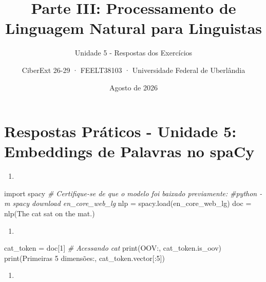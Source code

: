 \documentclass[
  brazilian,
]{article}
\title{Parte III: Processamento de Linguagem Natural para Linguistas}
\subtitle{Unidade 5 - Respostas dos Exercícios}
\author{CiberExt 26-29 · FEELT38103 · Universidade Federal de
Uberlândia}
\date{Agosto de 2026}
\newenvironment{Shaded}{}{}
\newcommand{\BuiltInTok}[1]{#1}
\newcommand{\CommentTok}[1]{\textcolor[rgb]{0.38,0.63,0.69}{\textit{#1}}}
\newcommand{\DecValTok}[1]{\textcolor[rgb]{0.25,0.63,0.44}{#1}}
\newcommand{\ImportTok}[1]{#1}
\newcommand{\NormalTok}[1]{#1}
\newcommand{\OperatorTok}[1]{\textcolor[rgb]{0.40,0.40,0.40}{#1}}
\newcommand{\StringTok}[1]{\textcolor[rgb]{0.25,0.44,0.63}{#1}}
\providecommand{\tightlist}{%
  \setlength{\itemsep}{0pt}\setlength{\parskip}{0pt}}
\begin{document}
\maketitle

\hypertarget{respostas-pruxe1ticos---unidade-5-embeddings-de-palavras-no-spacy}{%
\section{Respostas Práticos - Unidade 5: Embeddings de Palavras no
spaCy}\label{respostas-pruxe1ticos---unidade-5-embeddings-de-palavras-no-spacy}}

\begin{enumerate}
\def\labelenumi{\arabic{enumi}.}
\tightlist
\item
\end{enumerate}

\begin{Shaded}
\begin{Highlighting}[]
\ImportTok{import}\NormalTok{ spacy}
\CommentTok{\# Certifique{-}se de que o modelo foi baixado previamente: }
\CommentTok{\#python {-}m spacy download en\_core\_web\_lg}
\NormalTok{nlp }\OperatorTok{=}\NormalTok{ spacy.load(}\StringTok{\textquotesingle{}en\_core\_web\_lg\textquotesingle{}}\NormalTok{)}
\NormalTok{doc }\OperatorTok{=}\NormalTok{ nlp(}\StringTok{\textquotesingle{}The cat sat on the mat.\textquotesingle{}}\NormalTok{)}
\end{Highlighting}
\end{Shaded}

\begin{enumerate}
\def\labelenumi{\arabic{enumi}.}
\setcounter{enumi}{1}
\tightlist
\item
\end{enumerate}

\begin{Shaded}
\begin{Highlighting}[]
\NormalTok{cat\_token }\OperatorTok{=}\NormalTok{ doc[}\DecValTok{1}\NormalTok{] }\CommentTok{\# Acessando \textquotesingle{}cat\textquotesingle{}}
\BuiltInTok{print}\NormalTok{(}\StringTok{\textquotesingle{}OOV:\textquotesingle{}}\NormalTok{, cat\_token.is\_oov)}
\BuiltInTok{print}\NormalTok{(}\StringTok{\textquotesingle{}Primeiras 5 dimensões:\textquotesingle{}}\NormalTok{, cat\_token.vector[:}\DecValTok{5}\NormalTok{])}
\end{Highlighting}
\end{Shaded}

\begin{enumerate}
\def\labelenumi{\arabic{enumi}.}
\setcounter{enumi}{2}
\tightlist
\item
\end{enumerate}
\end{document}
